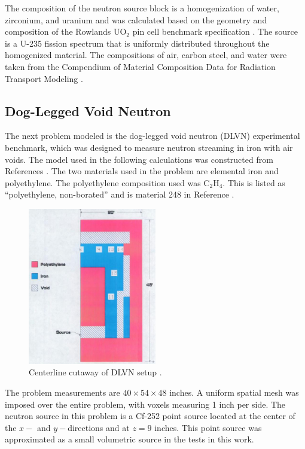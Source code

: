 \documentclass{article} %
\begin{document}
The composition of the neutron source block is a homogenization of water,
zirconium, and uranium and was calculated based on the geometry and composition
of the Rowlands UO$_2$ pin cell benchmark specification \cite{pincell}. The
source is a U-235 fission 
spectrum that is uniformly distributed throughout the homogenized material. The
compositions of air, carbon steel, and water were taken from the Compendium of 
Material Composition Data for Radiation Transport Modeling \cite{pnnl}.

\subsection{Dog-Legged Void Neutron}

The next problem modeled is the dog-legged void neutron (DLVN) experimental 
benchmark, which was designed to measure neutron streaming in iron with air
voids. The model used in the following calculations was constructed from
References \cite{sw-dlvn,j-dlvn,dlvn1991}. The two materials used in the
problem are elemental iron and polyethylene. The polyethylene composition used
was C$_2$H$_4$. This is listed as ``polyethylene, non-borated'' and is material
248 in Reference \cite{pnnl}. 

\begin{figure}[!htb]
\centering
\includegraphics[width=0.5\textwidth]{img/dlvn.png}
\caption{Centerline cutaway of DLVN setup \cite{sw-dlvn}.}
\label{dlvn}
\end{figure}

The problem measurements are $40\times54\times48$ inches. A uniform spatial
mesh was imposed over the entire problem, with voxels measuring 1 inch per side.
The neutron source in this problem is a Cf-252 point source located at the 
center of the $x-$ and $y-$directions and at $z = 9$ inches.
This point source was approximated as a small volumetric source in the tests in
this work.
\end{document}
